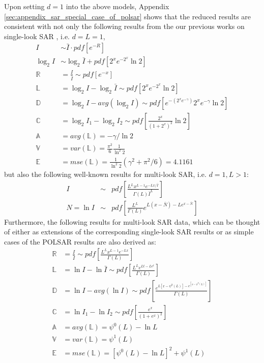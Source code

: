 \documentclass[journal]{IEEEtran}
\begin{document}
Upon setting $d=1$ into the above models,
  Appendix \ref{sec:appendix_sar_special_case_of_polsar} shows that the reduced results are consistent with
not only the following results from the our previous works on single-look SAR \cite{Le_2013_TGRS_SAR_MSE}, i.e. $d=L=1$,
\begin{align*}
  I &\sim \bar{I} \cdot pdf \left[ e^{-R} \right] \\
  \log_2{I} &\sim \log_2{\bar{I}} + pdf \left[ 2^xe^{-2^x}\ln2 \right] \\
  \mathbb{R} &= \frac{I}{\bar{I}} \sim pdf \left[ e^{-x} \right]  \\
  \mathbb{L} &= \log_2{I} - \log_2{\bar{I}} \sim pdf \left[ 2^xe^{-2^x}\ln2 \right]\\
  \mathbb{D} &= \log_2{I} - avg(\log_2{I}) \sim pdf \left[ e^{-(2^xe^{-\gamma})} 2^xe^{-\gamma} \ln2 \right] \\
  \mathbb{C} &= \log_2{I_1} - \log_2{I_2} \sim pdf \left[ \frac{2^x}{(1+2^x)^2} \ln2 \right] \\
  \mathbb{A} &= avg(\mathbb{L}) = -\gamma / \ln{2} \\
  \mathbb{V} &= var(\mathbb{L}) = \frac{\pi^2}{6} \frac{1}{ \ln^2{2}} \\
  \mathbb{E} &= mse(\mathbb{L}) = \frac{1}{\ln^2{2}}( \gamma^2 + \pi^2/6 ) = 4.1161 
\end{align*}
but also the following well-known results for multi-look SAR, i.e. $d=1,L>1$:
  \begin{eqnarray}
I &\sim& pdf \left[ \frac{L^L x^{L-1} e^{-Lx/\bar{I}}}{\Gamma(L) \bar{I}^L} \right] \\
N = \ln{I} &\sim& pdf \left[ \frac{L^L}{\Gamma(L)} e^{L(x-\bar{N})-Le^{x-\bar{N}}} \right]
  \end{eqnarray}
Furthermore, the following results for multi-look SAR data,
  which can be thought of 
    either as extensions of the corresponding single-look SAR results
    or as simple cases of the POLSAR results
  are also derived as:
  \begin{align*}
    \mathbb{R} &= \frac{I}{\bar{I}} \sim pdf \left[ \frac{ L^{L} x^{L-1} e^{-Lx}}{ \Gamma(L)} \label{eqn:multi_look_SAR_ratio_dist} \right]\\
    \mathbb{L} &= \ln{I} - \ln{\bar{I}} \sim pdf \left[ \frac{L^Le^{Lt-Le^t}}{ \Gamma(L)}  \right] \\
    \mathbb{D} &= \ln{I} - avg(\ln{I}) \sim pdf \left[ \frac{e^{L[x-\psi^0(L)]-e^{[x-\psi^0(L)]}}}{\Gamma(L)} \right] \\
    \mathbb{C} &= \ln{I_1} - \ln{I_2} \sim pdf \left[ \frac{e^{x}}{(1+e^x)^{2}} \right] \\
    \mathbb{A} &= avg(\mathbb{L}) = \psi^0(L) - \ln{L} \\
    \mathbb{V} &= var(\mathbb{L}) = \psi^1(L) \\
    \mathbb{E} &= mse(\mathbb{L}) = \left[ \psi^0(L) - \ln{L} \right]^2 + \psi^1(L)
  \end{align*}
\end{document}
